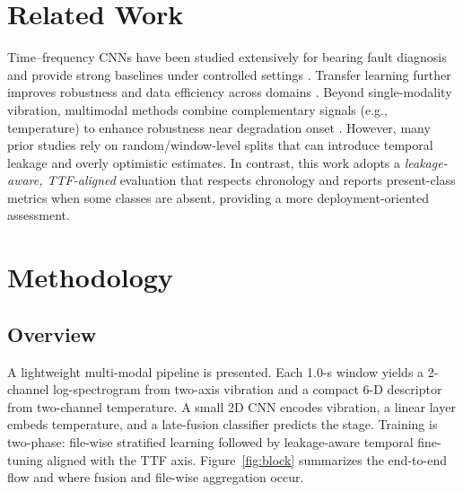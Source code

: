 \documentclass[pdflatex,sn-mathphys-num]{sn-jnl}%
\begin{document}
\section{Related Work}
Time--frequency CNNs have been studied extensively for bearing fault diagnosis and provide strong baselines under controlled settings \cite{zhao2019deep,lei2020roadmap,ince2016tie,wen2018neurocomputing}. Transfer learning further improves robustness and data efficiency across domains \cite{shao2019tii_transfer}. Beyond single-modality vibration, multimodal methods combine complementary signals (e.g., temperature) to enhance robustness near degradation onset \cite{baltrusaitis2019multimodal,huo2022tim_multisensor,gao2024inffus_multisource,xiao2025inffus_multilevel}. However, many prior studies rely on random/window-level splits that can introduce temporal leakage and overly optimistic estimates. In contrast, this work adopts a \emph{leakage-aware, TTF-aligned} evaluation that respects chronology and reports present-class metrics when some classes are absent, providing a more deployment-oriented assessment.

\section{Methodology}
\label{sec:method}

\subsection{Overview}
A lightweight multi-modal pipeline is presented. Each 1.0-s window yields a 2-channel log-spectrogram from two-axis vibration and a compact 6-D descriptor from two-channel temperature. A small 2D CNN encodes vibration, a linear layer embeds temperature, and a late-fusion classifier predicts the stage. Training is two-phase: file-wise stratified learning followed by leakage-aware temporal fine-tuning aligned with the TTF axis. Figure~\ref{fig:block} summarizes the end-to-end flow and where fusion and file-wise aggregation occur.
\end{document}
